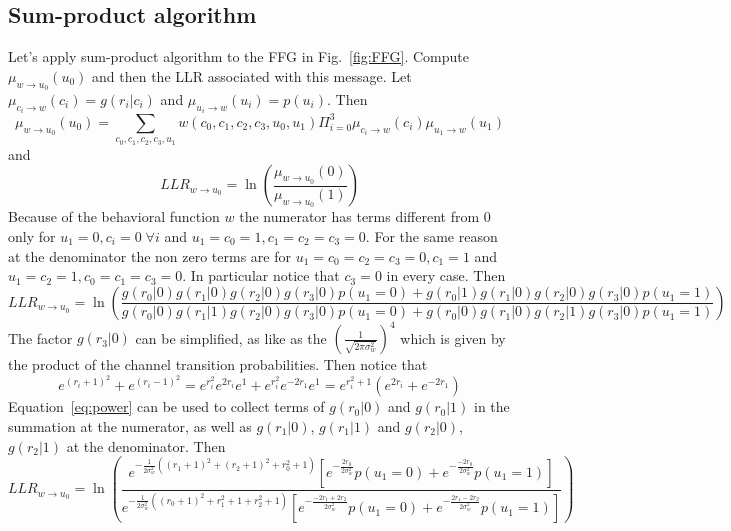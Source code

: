 \documentclass[10pt]{article}
\begin{document}
\subsection*{Sum-product algorithm}

Let's apply sum-product algorithm to the FFG in Fig.~\ref{fig:FFG}. Compute $\mu_{w\rightarrow u_0} (u_0)$ and then the LLR associated with this message.
Let $\mu_{c_i\rightarrow w}(c_i) = g(r_i|c_i)$ and $\mu_{u_i \rightarrow w}(u_i) = p(u_i)$. Then
\begin{equation}\label{eq:u0form1}
	\mu_{w\rightarrow u_0} (u_0) = \sum_{c_0, c_1, c_2, c_3, u_1} w(c_0, c_1, c_2, c_3, u_0, u_1) \Pi_{i=0}^{3}\mu_{c_i\rightarrow w} (c_i) \mu_{u_1 \rightarrow w} (u_1) 
\end{equation}
and
\begin{equation}
	LLR_{w\rightarrow u_0} = \ln \left( \frac{\mu_{w\rightarrow u_0} (0)}{\mu_{w\rightarrow u_0} (1)} \right)
\end{equation}
Because of the behavioral function $w$ the numerator has terms different from $0$ only for $u_1 = 0, c_i = 0 \; \forall i$ and $u_1 = c_0 = 1, c_1 = c_2 = c_3 = 0$. For the same reason at the denominator the non zero terms are for $u_1 = c_0 = c_2 = c_3 = 0, c_1 = 1$ and $u_1 = c_2 = 1, c_0 = c_1 = c_3 = 0$. In particular notice that $c_3 = 0$ in every case.
Then 
\begin{equation}
	LLR_{w\rightarrow u_0} = \ln 
		\left( 
		\frac{g(r_0|0)g(r_1|0)g(r_2|0)g(r_3|0)p(u_1=0) + g(r_0|1)g(r_1|0)g(r_2|0)g(r_3|0)p(u_1=1)}
		{g(r_0|0)g(r_1|1)g(r_2|0)g(r_3|0)p(u_1=0) + g(r_0|0)g(r_1|0)g(r_2|1)g(r_3|0)p(u_1=1)}
		\right)
\end{equation}
The factor $g(r_3|0)$ can be simplified, as like as the $(\frac{1}{\sqrt{2\pi \sigma_w^2}})^4$ which is given by the product of the channel transition probabilities. Then notice that
\begin{equation} \label{eq:power}
	e^{(r_i + 1)^2} + e^{(r_i - 1)^2} = 
	e^{r_i^2}e^{2r_i}e^{1} + e^{r_i^2}e^{-2r_1}e^{1} = e^{r_i^2 + 1} (e^{2r_i} + e^{-2r_1})
\end{equation} 
Equation~\eqref{eq:power} can be used to collect terms of $g(r_0|0)$ and $g(r_0|1)$ in the summation at the numerator, as well as $g(r_1|0)$, $g(r_1|1)$ and $g(r_2|0)$, $g(r_2|1)$ at the denominator. Then
\begin{equation}
	LLR_{w\rightarrow u_0} = \ln 
		\left( 
		\frac{
			e^{-\frac{1}{2\sigma_w^2} ((r_1+1)^2+(r_2+1)^2+r_0^2+1)}
				\left[
					e^{-\frac{2r_0}{2\sigma_w^2}}p(u_1=0)+e^{-\frac{-2r_0}{2\sigma_w^2}}p(u_1=1)
				\right]
		}{
			e^{-\frac{1}{2\sigma_w^2} ((r_0+1)^2+r_1^2+1+r_2^2+1)}
				\left[
					e^{-\frac{-2r_1 + 2r_2}{2\sigma_w^2}}p(u_1=0)+e^{-\frac{2r_1 - 2r_2}{2\sigma_w^2}}p(u_1=1)
				\right]
		}
		\right)
\end{equation}
\end{document}
